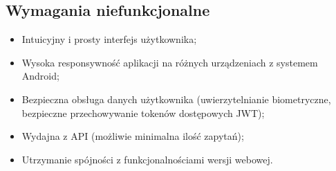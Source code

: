 \documentclass{article}
\begin{document}
		\subsection*{Wymagania niefunkcjonalne}
		\begin{itemize}
			\item Intuicyjny i prosty interfejs użytkownika;
			\item Wysoka responsywność aplikacji na różnych urządzeniach z systemem Android;
			\item Bezpieczna obsługa danych użytkownika (uwierzytelnianie biometryczne, bezpieczne przechowywanie tokenów dostępowych JWT);
			\item Wydajna z API (możliwie minimalna ilość zapytań);
			\item Utrzymanie spójności z funkcjonalnościami wersji webowej.
		\end{itemize}
	
\end{document}
